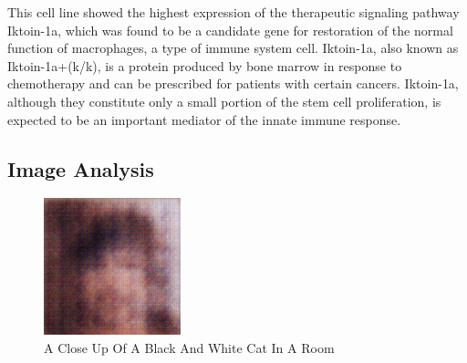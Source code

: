 \documentclass{article}%
\begin{document}
This cell line showed the highest expression of the therapeutic signaling pathway Iktoin{-}1a, which was found to be a candidate gene for restoration of the normal function of macrophages, a type of immune system cell. Iktoin{-}1a, also known as Iktoin{-}1a+(k/k), is a protein produced by bone marrow in response to chemotherapy and can be prescribed for patients with certain cancers. Iktoin{-}1a, although they constitute only a small portion of the stem cell proliferation, is expected to be an important mediator of the innate immune response.

%
\subsection{Image Analysis}%
\label{subsec:ImageAnalysis}%


\begin{figure}[h!]%
\centering%
\includegraphics[width=150px]{500_fake_images/samples_5_108.png}%
\caption{A Close Up Of A Black And White Cat In A Room}%
\end{figure}

%
\end{document}
